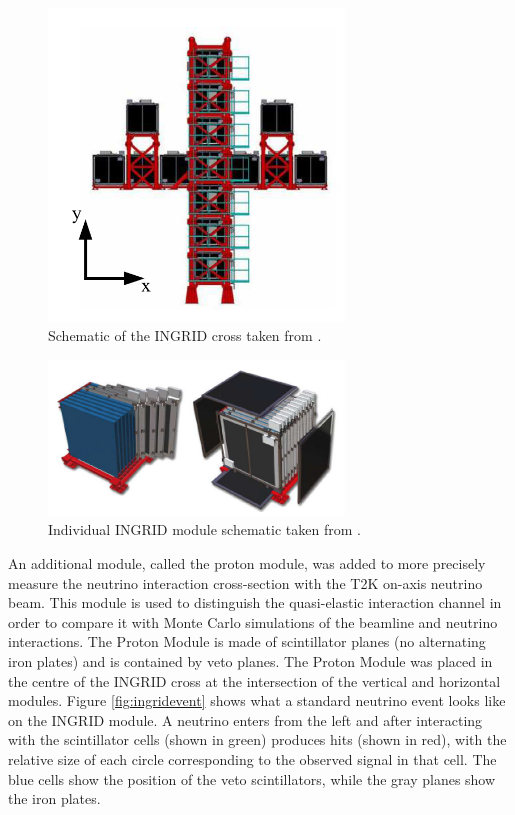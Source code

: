 \begin{figure}
    \centering
    \includegraphics[width=0.7\textwidth]{Figures/ingridcross.png}
    \caption{Schematic of the INGRID cross taken from \cite{t2k_collaboration_t2k_2013}.}
    \label{fig:ingridcross}
\end{figure}
\begin{figure}
    \centering
    \includegraphics[width=0.7\textwidth]{Figures/ingridmodule.png}
    \caption{Individual INGRID module schematic taken from \cite{t2k_collaboration_t2k_2013}.}
    \label{fig:ingridmodule}
\end{figure}

An additional module, called the proton module, was added to more precisely measure the neutrino interaction cross-section with the T2K on-axis neutrino beam. This module is used to distinguish the quasi-elastic interaction channel in order to compare it with Monte Carlo simulations of the beamline and neutrino interactions. The Proton Module is made of scintillator planes (no alternating iron plates) and is contained by veto planes. The Proton Module was placed in the centre of the INGRID cross at the intersection of the vertical and horizontal modules. Figure \ref{fig:ingridevent} shows what a standard neutrino event looks like on the INGRID module. A neutrino enters from the left and after interacting with the scintillator cells (shown in green) produces hits (shown in red), with the relative size of each circle corresponding to the observed signal in that cell. The blue cells show the position of the veto scintillators, while the gray planes show the iron plates.   


